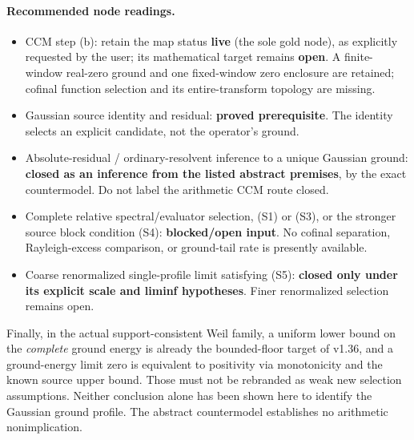 \paragraph{Recommended node readings.}
\begin{itemize}
\item CCM step (b): retain the map status \textbf{live} (the sole gold
node), as explicitly requested by the user; its mathematical target remains
\textbf{open}. A finite-window real-zero ground and
one fixed-window zero enclosure are retained; cofinal function selection
and its entire-transform topology are missing.
\item Gaussian source identity and residual: \textbf{proved prerequisite}.
The identity selects an explicit candidate, not the operator's ground.
\item Absolute-residual / ordinary-resolvent inference to a unique
Gaussian ground: \textbf{closed as an inference from the listed abstract
premises}, by the exact countermodel. Do not label the arithmetic CCM
route closed.
\item Complete relative spectral/evaluator selection, (S1) or (S3), or
the stronger source block condition (S4): \textbf{blocked/open input}.
No cofinal separation, Rayleigh-excess comparison, or ground-tail rate
is presently available.
\item Coarse renormalized single-profile limit satisfying (S5):
\textbf{closed only under its explicit scale and liminf hypotheses}.
Finer renormalized selection remains open.
\end{itemize}
Finally, in the actual support-consistent Weil family, a uniform lower
bound on the \emph{complete} ground energy is already the bounded-floor
target of v1.36, and a ground-energy limit zero is equivalent to positivity
via monotonicity and the known source upper bound. Those must not be
rebranded as weak new selection assumptions. Neither conclusion alone
has been shown here to identify the Gaussian ground profile. The
abstract countermodel establishes no arithmetic nonimplication.
